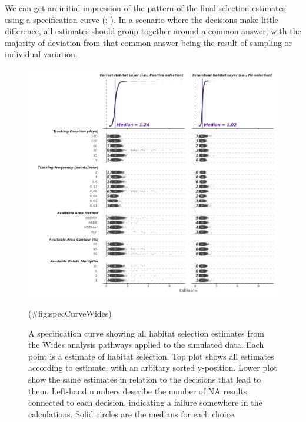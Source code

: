 \documentclass[10pt,a4paper]{article}
\begin{document}
We can get an initial impression of the pattern of the final selection estimates using a specification curve (; ).
In a scenario where the decisions make little difference, all estimates should group together around a common answer, with the majority of deviation from that common answer being the result of sampling or individual variation.

\begin{figure}
\includegraphics[width=1\linewidth]{../figures/widesSpecCurve} \caption{A specification curve showing all habitat selection estimates from the Wides analysis pathways applied to the simulated data. Each point is a estimate of habitat selection. Top plot shows all estimates according to estimate, with an arbitary sorted y-position. Lower plot show the same estimates in relation to the decisions that lead to them. Left-hand numbers describe the number of NA results connected to each decision, indicating a failure somewhere in the calculations. Solid circles are the medians for each choice.}(\#fig:specCurveWides)
\end{figure}
\end{document}
